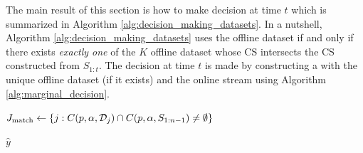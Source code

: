 The main result of this section is how to make decision at time $t$ which is summarized in Algorithm \ref{alg:decision_making_datasets}. In a nutshell, Algorithm \ref{alg:decision_making_datasets} uses the offline dataset if and only if there exists \emph{exactly one} of the $K$ offline dataset whose CS intersects the CS constructed from $S_{1:t}$. The decision at time $t$ is made by constructing a with the unique offline dataset (if it exists) and the online stream using Algorithm \ref{alg:marginal_decision}.


\begin{algorithm}
\caption{Decision making with offline data}\label{alg:decision_making_datasets}
    
    $J_{\text{match}} \gets  \{ j : C(p, \alpha, {\mathcal{D}}_j)\cap C(p, \alpha,S_{1:n-1}) \neq \emptyset \}$\;
    
  \Return $\hat{y}$\;
\end{algorithm}

